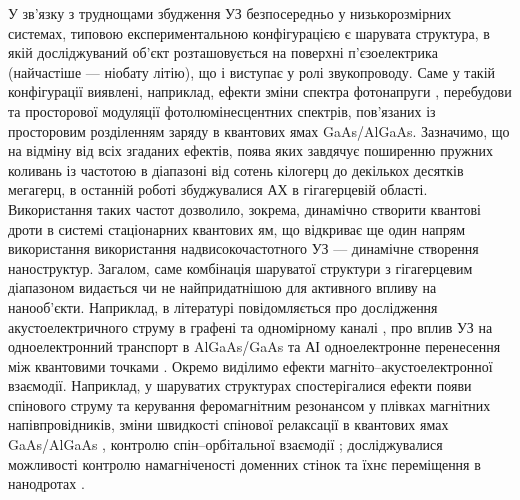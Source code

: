 У зв'язку з труднощами збудження УЗ безпосередньо у низькорозмірних системах, типовою
експериментальною конфігурацією є шарувата структура, в якій досліджуваний об'єкт розташовується на поверхні п'єзоелектрика (найчастіше --- ніобату літію), що і виступає у ролі звукопроводу.
Саме у такій конфігурації виявлені, наприклад, ефекти зміни спектра фотонапруги \cite{KurylJTF09}, перебудови \cite{Kuryliuk2009} та просторової модуляції \cite{US:PL:GaAs} фотолюмінесцентних спектрів, пов'язаних із просторовим розділенням заряду в квантових ямах  GaAs/AlGaAs.
Зазначимо, що на відміну від всіх згаданих ефектів, поява яких завдячує поширенню пружних коливань із частотою в діапазоні від сотень кілогерц до декількох десятків мегагерц,
в останній роботі збуджувалися АХ в гігагерцевій області.
Використання таких частот дозволило, зокрема, динамічно створити квантові дроти в системі стаціонарних квантових ям, що відкриває ще один напрям використання використання надвисокочастотного УЗ --- динамічне створення наноструктур.
Загалом, саме комбінація шаруватої структури з гігагерцевим діапазоном видається чи не найпридатнішою для активного впливу на нанооб'єкти.
Наприклад, в літературі повідомляється про дослідження акустоелектричного струму в графені \cite{US:graphen,US:grafen2,US:grafen3,US:grafen4} та одномірному каналі \cite{US:1D,NETO2016},
про вплив УЗ на одноелектронний транспорт в AlGaAs/GaAs \cite{US:single,US:single2} та
АІ одноелектронне перенесення між квантовими точками \cite{US:Nature}.
Окремо виділимо ефекти магніто--акустоелектронної взаємодії.
 Наприклад, у шаруватих структурах спостерігалися ефекти появи спінового струму \cite{PhysRevLett108:176601} та керування феромагнітним резонансом \cite{PhysRevB90:094401} у плівках магнітних напівпровідників,
зміни  швидкості спінової релаксації в квантових ямах GaAs/AlGaAs \cite{PhysRevB78:153305},
контролю спін--орбітальної взаємодії \cite{Sanada:2011};
досліджувалися можливості контролю намагніченості доменних стінок \cite{LI2014} та їхнє переміщення в нанодротах \cite{US:nanowire}.



